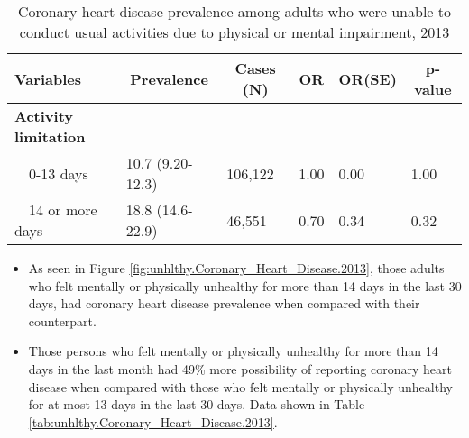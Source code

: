 \begin{table}[H]
\caption{Coronary heart disease prevalence among adults who were unable to conduct usual activities due to physical or mental impairment, 2013\label{tab:poor.Coronary_Heart_Disease.2013}} 
\begin{center}
\begin{tabular}{llllll}
\hline\hline
\multicolumn{1}{l}{Variables}&\multicolumn{1}{c}{Prevalence}&\multicolumn{1}{c}{Cases (N)}&\multicolumn{1}{c}{OR}&\multicolumn{1}{c}{OR(SE)}&\multicolumn{1}{c}{p-value}\tabularnewline
\hline
{\bfseries Activity limitation}&&&&&\tabularnewline
~~0-13 days&10.7 (9.20-12.3)&106,122&1.00&0.00&1.00\tabularnewline
~~14 or more days&18.8 (14.6-22.9)& 46,551&0.70&0.34&0.32\tabularnewline
\hline
\end{tabular}\end{center}

\end{table}


\newpage
\begin{itemize}

\item As seen in Figure \ref{fig:unhlthy.Coronary_Heart_Disease.2013}, those adults who felt mentally or physically unhealthy for more than 14 days in the last 30 days, had  
coronary heart disease prevalence when compared with their counterpart.


\item Those persons who felt mentally or physically unhealthy for more than 14 days in the last month had 49\% more possibility of reporting coronary heart disease when compared with those who felt mentally or physically unhealthy for at most 13 days in the last 30 days. Data shown in Table \ref{tab:unhlthy.Coronary_Heart_Disease.2013}.

\end{itemize}

